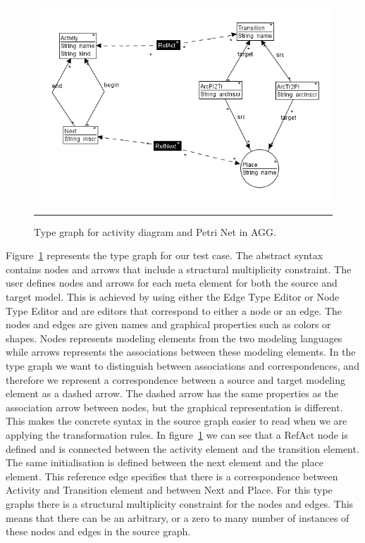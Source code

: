 \begin{figure}[H]
	\centering
	\includegraphics[scale=0.7]{figures/AggTypeGraph.png}
	\rule{35em}{0.5pt}
	\caption[Type graph in AGG]
	{Type graph for activity diagram and Petri Net in AGG.}
	\label{fig:AggTypeGraph}
\end{figure}

Figure~\ref{fig:AggTypeGraph} represents the type graph for our test case. The
abstract syntax contains nodes and arrows that include a structural multiplicity
constraint. The user defines nodes and arrows for each meta element for both
the source and target model. This is achieved by using either the Edge Type
Editor or Node Type Editor and are editors that correspond to either a node or
an edge. The nodes and edges are given names and graphical properties such as
colors or shapes. Nodes represents modeling elements from the two modeling
languages while arrows represents the associations between these modeling
elements. In the type graph we want to distinguish between associations and
correspondences, and therefore we represent a correspondence between a source
and target modeling element as a dashed arrow. The dashed arrow has the same
properties as the association arrow between nodes, but the graphical
representation is different. This makes the concrete syntax in the source graph
easier to read when we are applying the transformation rules. In
figure~\ref{fig:AggTypeGraph} we can see that a RefAct node is defined and is
connected between the activity element and the transition element. The same
initialisation is defined between the next element and the place element. This
reference edge specifies that there is a correspondence between Activity and
Transition element and between Next and Place. For this type graphs there is a
structural multiplicity constraint for the nodes and edges. This means that
there can be an arbitrary, or a zero to many number of instances of these nodes
and edges in the source graph.

